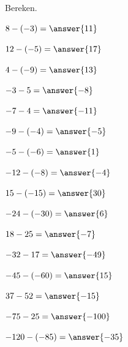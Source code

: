 \documentclass{ximera}
\begin{document}
\begin{oefening}{\oefB\ESS}

Bereken.

\begin{question} \(8-(-3)=\answer{11}\) \end{question}

\begin{question} \(12-(-5)=\answer{17}\) \end{question}

\begin{question} \(4-(-9)=\answer{13}\) \end{question}

\begin{question} \(-3-5=\answer{-8}\) \end{question}

\begin{question} \(-7-4=\answer{-11}\) \end{question}

\begin{question} \(-9-(-4)=\answer{-5}\) \end{question}

\begin{question} \(-5-(-6)=\answer{1}\) \end{question}

\begin{question} \(-12-(-8)=\answer{-4}\) \end{question}

\begin{question} \(15-(-15)=\answer{30}\) \end{question}

\begin{question} \(-24-(-30)=\answer{6}\) \end{question}

\begin{question} \(18-25=\answer{-7}\) \end{question}

\begin{question} \(-32-17=\answer{-49}\) \end{question}

\begin{question} \(-45-(-60)=\answer{15}\) \end{question}

\begin{question} \(37-52=\answer{-15}\) \end{question}

\begin{question} \(-75-25=\answer{-100}\) \end{question}

\begin{question} \(-120-(-85)=\answer{-35}\) \end{question}

\end{oefening}
\end{document}
